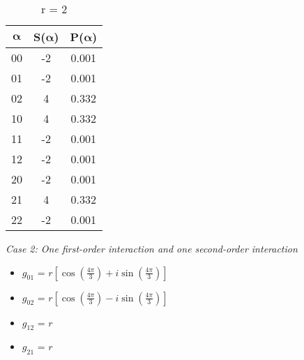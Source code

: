 \begin{table}[h]
\begin{subtable}{.3\textwidth}
        \centering
        \caption{r = 2}
        \begin{tabular}{ccc}
            \toprule
             $\boldsymbol{\alpha}$ & S($\boldsymbol{\alpha}$) & P($\boldsymbol{\alpha}$)\\
            \midrule
            00 & -2 & 0.001 \\
            01 & -2 & 0.001 \\
            02 & 4 & 0.332 \\
            10 & 4 & 0.332 \\
            11 & -2 & 0.001 \\
            12 & -2 & 0.001 \\
            20 & -2 & 0.001 \\
            21 & 4 & 0.332 \\
            22 & -2 & 0.001 \\
          \bottomrule
        \end{tabular}
    \end{subtable}
\end{table}

\noindent
\textit{Case 2: One first-order interaction and one second-order interaction}

\begin{itemize}
    \item $g_{01}$ = $r\left[\cos\left( \frac{4\pi}{3}\right) + i \sin\left( \frac{4\pi}{3}\right)\right]$
    \item $g_{02}$ = $r\left[\cos\left( \frac{4\pi}{3}\right) - i \sin\left( \frac{4\pi}{3}\right)\right]$
    \item $g_{12}$ = $r$
    \item $g_{21}$ = $r$
\end{itemize}

